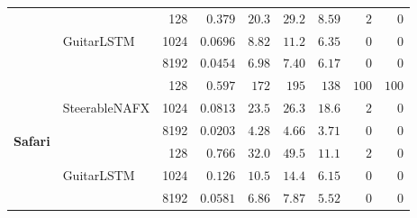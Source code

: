 \begin{table}[htbp]
\begin{tabular}{llrrrrrrr}
   & \multirow{3}{*}{GuitarLSTM} & 128 & $0.379$ & $20.3$ & $29.2$ & $8.59$ & $2$ & $0$ \\
   &  & 1024 & $0.0696$ & $8.82$ & $11.2$ & $6.35$ & $0$ & $0$ \\
   &  & 8192 & $0.0454$ & $6.98$ & $7.40$ & $6.17$ & $0$ & $0$ \\
\midrule
  \multirow{6}{*}{\textbf{Safari}} & \multirow{3}{*}{SteerableNAFX} & 128 & $0.597$ & $172$ & $195$ & $138$ & $100$ & $100$ \\
   &  & 1024 & $0.0813$ & $23.5$ & $26.3$ & $18.6$ & $2$ & $0$ \\
   &  & 8192 & $0.0203$ & $4.28$ & $4.66$ & $3.71$ & $0$ & $0$ \\
   & \multirow{3}{*}{GuitarLSTM} & 128 & $0.766$ & $32.0$ & $49.5$ & $11.1$ & $2$ & $0$ \\
   &  & 1024 & $0.126$ & $10.5$ & $14.4$ & $6.15$ & $0$ & $0$ \\
   &  & 8192 & $0.0581$ & $6.86$ & $7.87$ & $5.52$ & $0$ & $0$ \\
\bottomrule
\end{tabular}
\end{table}
